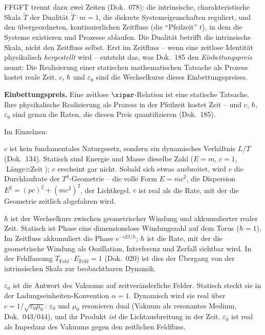 FFGFT trennt dazu zwei Zeiten (Dok.~078): die intrinsische, charakteristische
Skala $\tilde T$ der Dualität $\tilde T\cdot m=1$, die diskrete
Systemeigenschaften reguliert, und den übergeordneten, kontinuierlichen Zeitfluss
(die ``Pfeilzeit'' $t$), in dem die Systeme existieren und Prozesse ablaufen. Die
Dualität betrifft die intrinsische Skala, nicht den Zeitfluss selbst. Erst im
Zeitfluss -- wenn eine zeitlose Identität physikalisch \emph{hergestellt} wird --
entsteht das, was Dok.~185 den \emph{Einbettungspreis} nennt: Die Realisierung
einer statischen mathematischen Tatsache als Prozess kostet reale Zeit. $c$,
$\hbar$ und $\varepsilon_0$ sind die Wechselkurse dieses Einbettungspreises.

\begin{erkenntnis}
\textbf{Einbettungspreis.} Eine zeitlose $\xipar$-Relation ist eine statische
Tatsache. Ihre physikalische Realisierung als Prozess in der Pfeilzeit kostet
Zeit -- und $c$, $\hbar$, $\varepsilon_0$ sind genau die Raten, die diesen Preis
quantifizieren (Dok.~185).
\end{erkenntnis}

Im Einzelnen:

\textbf{$c$} ist kein fundamentales Naturgesetz, sondern ein dynamisches
Verhältnis $L/T$ (Dok.~134). Statisch sind Energie und Masse dieselbe Zahl
($E=m$, $c=1$, $\text{Länge}\equiv\text{Zeit}$); $c$ erscheint gar nicht. Sobald
sich etwas ausbreitet, wird $c$ die Durchlaufrate der $T^4$-Geometrie -- die volle
Form $E=mc^2$, die Dispersion $E^2=(pc)^2+(mc^2)^2$, der Lichtkegel. $c$ ist real
als die Rate, mit der die Geometrie zeitlich abgefahren wird.

\textbf{$\hbar$} ist der Wechselkurs zwischen geometrischer Windung und
akkumulierter realer Zeit. Statisch ist Phase eine dimensionslose Windungszahl auf
dem Torus ($\hbar=1$). Im Zeitfluss akkumuliert die Phase $e^{-iEt/\hbar}$;
$\hbar$ ist die Rate, mit der die geometrische Windung als Oszillation,
Interferenz und Zerfall sichtbar wird. In der Feldfassung $T_{\text{Feld}}\cdot
E_{\text{Feld}}=1$ (Dok.~020) ist dies der Übergang von der intrinsischen Skala
zur beobachtbaren Dynamik.

\textbf{$\varepsilon_0$} ist die Antwort des Vakuums auf zeitveränderliche Felder.
Statisch steckt sie in der Ladungseinheiten-Konvention $\alpha=1$. Dynamisch wird
sie real über $c=1/\sqrt{\varepsilon_0\mu_0}$: $\varepsilon_0$ und $\mu_0$
resonieren dual (Vakuum als resonantes Medium, Dok.~043/044), und ihr Produkt
\emph{ist} die Lichtausbreitung in der Zeit. $\varepsilon_0$ ist real als
Impedanz des Vakuums gegen den zeitlichen Feldfluss.

